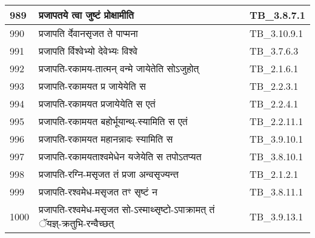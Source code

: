 \documentclass[17pt]{extarticle}
\begin{document}
\begin{longtable}{||p{0.4in}||p{4.9in}||p{0.9in}||}
    \hline
        
    989 & प्रजापतये त्वा जुष्टं प्रोक्षामीति & TB\_3.8.7.1       \\
    
    \hline
        
    990 & प्रजापति र्देवानसृजत ते पाप्मना & TB\_3.10.9.1       \\
    
    \hline
        
    991 & प्रजापति र्विश्वेभ्यो देवेभ्यः विश्वे & TB\_3.7.6.3       \\
    
    \hline
        
    992 & प्रजापति{-}रकामय{-}तात्मन् वन्मे जायेतेति सोऽजुहोत् & TB\_2.1.6.1       \\
    
    \hline
        
    993 & प्रजापति{-}रकामयत प्र जायेयेति स & TB\_2.2.3.1       \\
    
    \hline
        
    994 & प्रजापति{-}रकामयत प्रजायेयेति स एतं & TB\_2.2.4.1       \\
    
    \hline
        
    995 & प्रजापति{-}रकामयत बहोर्भूयान्थ्{-}स्यामिति स एतं & TB\_2.2.11.1       \\
    
    \hline
        
    996 & प्रजापति{-}रकामयत महानन्नादः स्यामिति स & TB\_3.9.10.1       \\
    
    \hline
        
    997 & प्रजापति{-}रकामयताश्वमेधेन यजेयेति स तपोऽतप्यत & TB\_3.8.10.1       \\
    
    \hline
        
    998 & प्रजापति{-}रग्नि{-}मसृजत तं प्रजा अन्वसृज्यन्त & TB\_2.1.2.1       \\
    
    \hline
        
    999 & प्रजापति{-}रश्वमेध{-}मसृजत तꣳ सृष्टं न & TB\_3.8.11.1       \\
    
    \hline
        
    1000 & प्रजापति{-}रश्वमेध{-}मसृजत सो{-}ऽस्माथ्सृष्टो{-}ऽपाक्रामत् तं ॅयज्ञ्{-}क्रतुभि{-}रन्वैच्छत् & TB\_3.9.13.1       \\
    

\end{longtable}
\end{document}
